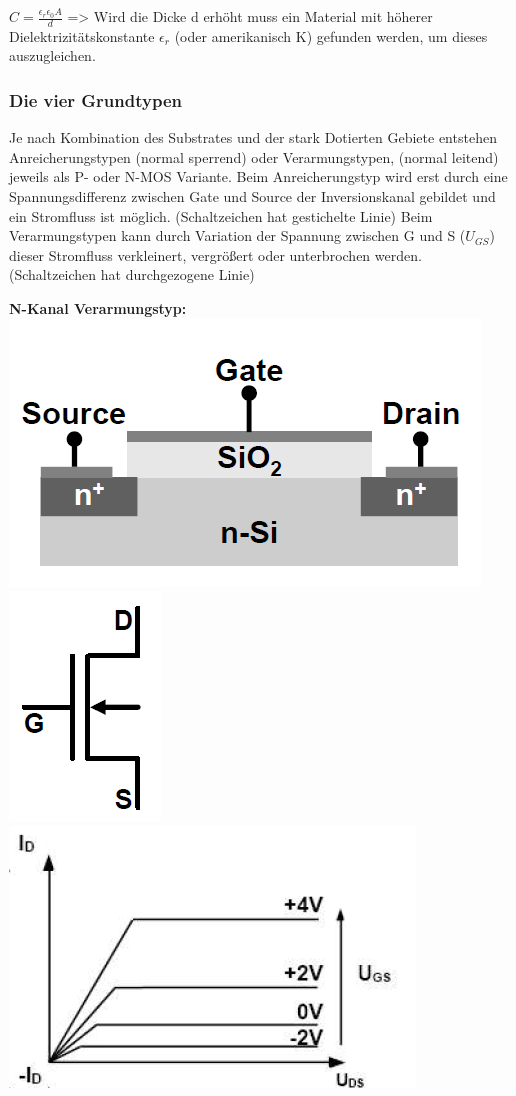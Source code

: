 		$C = \frac{\epsilon_r  \epsilon_0 A}{d}$ => Wird die Dicke d erhöht muss ein Material mit höherer Dielektrizitätskonstante $\epsilon_r$ (oder amerikanisch K) gefunden werden, um dieses auszugleichen.
	\newpage
	\subsubsection{Die vier Grundtypen}
		Je nach Kombination des Substrates und der stark Dotierten Gebiete entstehen Anreicherungstypen (normal sperrend) oder Verarmungstypen, (normal leitend) jeweils als P- oder N-MOS Variante.
		\newline
		Beim Anreicherungstyp wird erst durch eine Spannungsdifferenz zwischen Gate und Source der Inversionskanal gebildet und ein Stromfluss ist möglich. (Schaltzeichen hat gestichelte Linie)
		\newline
		Beim Verarmungstypen kann durch Variation der Spannung zwischen G und S ($U_{GS}$) dieser Stromfluss verkleinert, vergrößert oder unterbrochen werden. (Schaltzeichen hat durchgezogene Linie)
		
		
		\textbf{N-Kanal Verarmungstyp:}
		\newline
		\includegraphics[width=0.35\linewidth]{Kapitel/Kap06/VerarmungNKanalSchnitt}
		\includegraphics[width=0.125\linewidth]{Kapitel/Kap06/VerarmungNKanalSchaltsymbol}
		\includegraphics[width=0.325\linewidth]{Kapitel/Kap06/VerarmungNKanalKennlinie}
		
